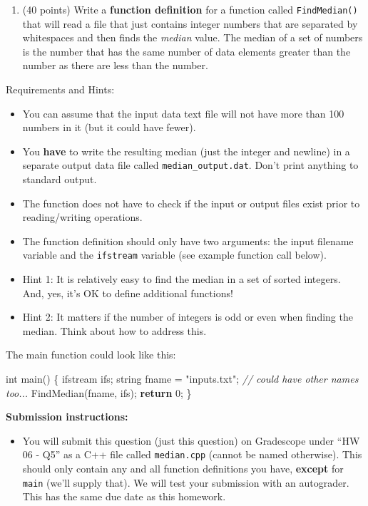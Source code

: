 \documentclass[
]{article}
\newenvironment{Shaded}{}{}
\newcommand{\CommentTok}[1]{\textcolor[rgb]{0.38,0.63,0.69}{\textit{#1}}}
\newcommand{\ControlFlowTok}[1]{\textcolor[rgb]{0.00,0.44,0.13}{\textbf{#1}}}
\newcommand{\DataTypeTok}[1]{\textcolor[rgb]{0.56,0.13,0.00}{#1}}
\newcommand{\DecValTok}[1]{\textcolor[rgb]{0.25,0.63,0.44}{#1}}
\newcommand{\NormalTok}[1]{#1}
\newcommand{\StringTok}[1]{\textcolor[rgb]{0.25,0.44,0.63}{#1}}
\providecommand{\tightlist}{%
  \setlength{\itemsep}{0pt}\setlength{\parskip}{0pt}}
\begin{document}
\pagebreak

\begin{enumerate}
\def\labelenumi{\arabic{enumi}.}
\setcounter{enumi}{4}
\tightlist
\item
  (40 points) Write a \textbf{function definition} for a function called
  \texttt{FindMedian()} that will read a file that just contains integer
  numbers that are separated by whitespaces and then finds the
  \emph{median} value. The median of a set of numbers is the number that
  has the same number of data elements greater than the number as there
  are less than the number.
\end{enumerate}

Requirements and Hints:

\begin{itemize}
\tightlist
\item
  You can assume that the input data text file will not have more than
  100 numbers in it (but it could have fewer).
\item
  You \textbf{have} to write the resulting median (just the integer and
  newline) in a separate output data file called
  \texttt{median\_output.dat}. Don't print anything to standard output.
\item
  The function does not have to check if the input or output files exist
  prior to reading/writing operations.
\item
  The function definition should only have two arguments: the input
  filename variable and the \texttt{ifstream} variable (see example
  function call below).
\item
  Hint 1: It is relatively easy to find the median in a set of sorted
  integers. And, yes, it's OK to define additional functions!
\item
  Hint 2: It matters if the number of integers is odd or even when
  finding the median. Think about how to address this.
\end{itemize}

The main function could look like this:

\begin{Shaded}
\begin{Highlighting}[]
\DataTypeTok{int}\NormalTok{ main() \{}
\NormalTok{   ifstream ifs;}
\NormalTok{   string fname = }\StringTok{"inputs.txt"}\NormalTok{; }\CommentTok{// could have other names too...}
\NormalTok{   FindMedian(fname, ifs);}
   \ControlFlowTok{return} \DecValTok{0}\NormalTok{;}
\NormalTok{\}}
\end{Highlighting}
\end{Shaded}

\textbf{Submission instructions:}

\begin{itemize}
\tightlist
\item
  You will submit this question (just this question) on Gradescope under
  ``HW 06 - Q5'' as a C++ file called \texttt{median.cpp} (cannot be
  named otherwise). This should only contain any and all function
  definitions you have, \textbf{except} for \texttt{main} (we'll supply
  that). We will test your submission with an autograder. This has the
  same due date as this homework.
\end{itemize}
\end{document}
